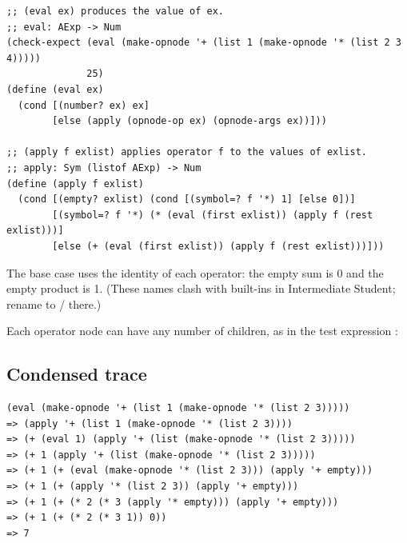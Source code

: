 \begin{lstlisting}[style=racket]
;; (eval ex) produces the value of ex.
;; eval: AExp -> Num
(check-expect (eval (make-opnode '+ (list 1 (make-opnode '* (list 2 3 4)))))
              25)
(define (eval ex)
  (cond [(number? ex) ex]
        [else (apply (opnode-op ex) (opnode-args ex))]))

;; (apply f exlist) applies operator f to the values of exlist.
;; apply: Sym (listof AExp) -> Num
(define (apply f exlist)
  (cond [(empty? exlist) (cond [(symbol=? f '*) 1] [else 0])]
        [(symbol=? f '*) (* (eval (first exlist)) (apply f (rest exlist)))]
        [else (+ (eval (first exlist)) (apply f (rest exlist)))]))
\end{lstlisting}
The base case uses the identity of each operator: the empty sum is 0 and the
empty product is 1. (These names clash with built-ins in Intermediate
Student; rename to / there.)

Each operator node can have any number of children, as in the test
expression :

\begin{center}
\end{center}

\subsection{Condensed trace}
\begin{lstlisting}[style=racket]
(eval (make-opnode '+ (list 1 (make-opnode '* (list 2 3)))))
=> (apply '+ (list 1 (make-opnode '* (list 2 3))))
=> (+ (eval 1) (apply '+ (list (make-opnode '* (list 2 3)))))
=> (+ 1 (apply '+ (list (make-opnode '* (list 2 3)))))
=> (+ 1 (+ (eval (make-opnode '* (list 2 3))) (apply '+ empty)))
=> (+ 1 (+ (apply '* (list 2 3)) (apply '+ empty)))
=> (+ 1 (+ (* 2 (* 3 (apply '* empty))) (apply '+ empty)))
=> (+ 1 (+ (* 2 (* 3 1)) 0))
=> 7
\end{lstlisting}

